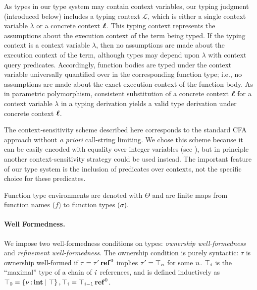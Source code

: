 As types in our type system may contain context variables, our typing judgment
(introduced below) includes a typing context $\mathcal{L}$, which is either a single
context variable $\lambda$ or a concrete context $\oldvec{\ell}$. This typing context
represents the assumptions about the execution context of the term being
typed. If the typing context is a context variable $\lambda$, then no assumptions
are made about the execution context of the term, although types
may depend upon $\lambda$ with context query predicates.
Accordingly, function bodies are typed under the context variable
universally quantified over in the corresponding function type; i.e.,
no assumptions are made about the exact execution context of the function body.
As in parametric polymorphism, consistent
substitution of a concrete context $\oldvec{\ell}$ for a context variable $\lambda$
in a typing derivation yields a valid type derivation under concrete context $\oldvec{\ell}$.

\begin{remark}
  \label{rem:cfa}
  The context-sensitivity scheme described here corresponds
  to the standard CFA approach \cite{shivers1991control} without \emph{a priori} call-string limiting.
  We chose this scheme because it can be easily encoded with equality over integer variables (see ),
  but in principle another context-sensitivity strategy could be used instead. The important
  feature of our type system is the inclusion of predicates over
  contexts, not the specific choice for these predicates.
\end{remark}

Function type environments are denoted with $\Theta$ and are finite
maps from function names ($\mathit{f}$) to function types ($\sigma$).

\paragraph{Well Formedness.}
We impose two well-formedness conditions on types:
\emph{ownership well-formedness} and \emph{refinement well-formedness}.
The ownership condition is purely syntactic:
$\tau$ is ownership well-formed if $\tau  =   \tau'  \operatorname{\mathbf{ref}}^{ 0 } $ implies
$\tau'  =  \top_{\mathit{n}}$ for some $\mathit{n}$. $\top_{\mathit{i}}$ is the ``maximal'' type
of a chain of $\mathit{i}$ references, and is defined inductively as
$\top_{{\mathrm{0}}}  =   \left\{{  \nu  \operatorname{:} \mathbf{int} \mid   \top  }\right\} , \top_{\mathit{i}}  =   \top_{{\mathit{i}-1}}  \operatorname{\mathbf{ref}}^{ 0 } $.


